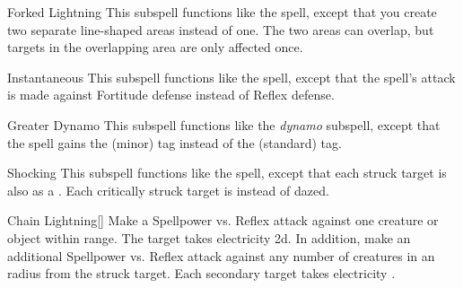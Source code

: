 \begin{ability}[\nth{3}]{Forked Lightning}
This subspell functions like the  spell, except that you create two separate line-shaped areas instead of one.
The two areas can overlap, but targets in the overlapping area are only affected once.
\end{ability}
\vspace{0.25em}


\begin{ability}[\nth{4}]{Instantaneous}
This subspell functions like the  spell, except that the spell's attack is made against Fortitude defense instead of Reflex defense.
\end{ability}
\vspace{0.25em}


\begin{ability}[\nth{5}]{Greater Dynamo}
This subspell functions like the \textit{dynamo} subspell, except that the spell gains the  (minor) tag instead of the  (standard) tag.
\end{ability}
\vspace{0.25em}


\begin{ability}[\nth{5}]{Shocking}
This subspell functions like the  spell, except that each struck target is also  as a .
Each critically struck target is  instead of dazed.
\end{ability}
\vspace{0.25em}


\begin{ability}[\nth{6}]{Chain Lightning}[]
Make a Spellpower vs. Reflex attack against one creature or object within \rngmed range.
\hit The target takes electricity  \plus2d.
In addition, make an additional Spellpower vs. Reflex attack against any number of creatures in an \areamed radius from the struck target.
\hit Each secondary target takes electricity .
\end{ability}
\vspace{0.25em}

